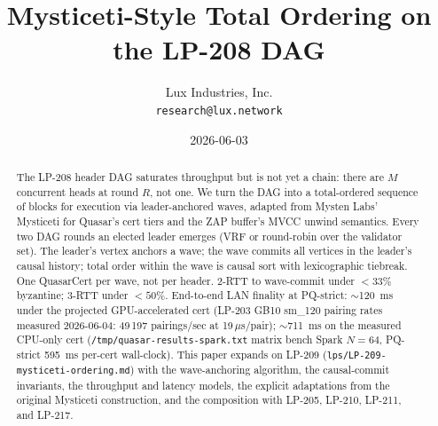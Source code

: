 \documentclass[11pt,a4paper]{article}
\title{Mysticeti-Style Total Ordering on the LP-208 DAG}
\author{Lux Industries, Inc. \\
        \texttt{research@lux.network}}
\date{2026-06-03}
\begin{document}
\luxcoverpage

\begin{abstract}
The LP-208 header DAG saturates throughput but is not yet a chain:
there are $M$ concurrent heads at round $R$, not one. We turn the
DAG into a total-ordered sequence of blocks for execution via
leader-anchored waves, adapted from Mysten Labs' Mysticeti
\cite{mysticeti2024} for Quasar's cert tiers and the ZAP buffer's
MVCC unwind semantics. Every two DAG rounds an elected leader emerges
(VRF or round-robin over the validator set). The leader's vertex
anchors a wave; the wave commits all vertices in the leader's causal
history; total order within the wave is causal sort with
lexicographic tiebreak. One QuasarCert per wave, not per header.
2-RTT to wave-commit under $<33\%$ byzantine; 3-RTT under $<50\%$.
End-to-end LAN finality at PQ-strict: $\sim$\SI{120}{\milli\second}
under the projected GPU-accelerated cert (LP-203 GB10 sm\_120
pairing rates measured 2026-06-04: 49\,197 pairings/sec at
19\,$\mu$s/pair); $\sim$\SI{711}{\milli\second} on the measured
CPU-only cert (\texttt{/tmp/quasar-results-spark.txt} matrix bench
Spark $N{=}64$, PQ-strict \SI{595}{\milli\second} per-cert
wall-clock).
This paper expands on LP-209 (\texttt{lps/LP-209-mysticeti-ordering.md})
with the wave-anchoring algorithm, the causal-commit invariants, the
throughput and latency models, the explicit adaptations from the
original Mysticeti construction, and the composition with LP-205,
LP-210, LP-211, and LP-217.
\end{abstract}

\tableofcontents
\newpage









\end{document}
